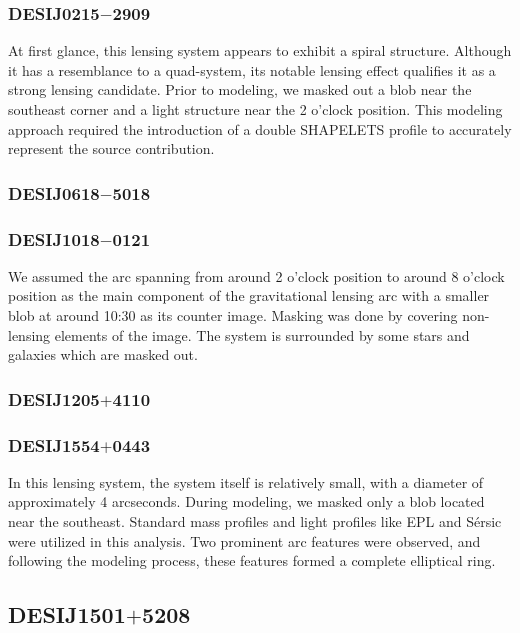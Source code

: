 \documentclass{aa}
\begin{document}
\subsubsection{DESIJ0215$-$2909}

At first glance, this lensing system appears to exhibit a spiral structure. Although it has a resemblance to a quad-system, its notable lensing effect qualifies it as a strong lensing candidate. Prior to modeling, we masked out a blob near the southeast corner and a light structure near the 2 o'clock position. This modeling approach required the introduction of a double SHAPELETS profile to accurately represent the source contribution.

\subsubsection{DESIJ0618$-$5018}


\subsubsection{DESIJ1018$-$0121}

We assumed the arc spanning from around 2 o'clock position to around 8 o'clock position as the main component of the gravitational lensing arc with a smaller blob at around 10:30 as its counter image. Masking was done by covering non-lensing elements of the image. The system is surrounded by some stars and galaxies which are masked out.

\subsubsection{DESIJ1205$+$4110}


\subsubsection{DESIJ1554$+$0443}

In this lensing system, the system itself is relatively small, with a diameter of approximately 4 arcseconds. During modeling, we masked only a blob located near the southeast. Standard mass profiles and light profiles like EPL and S\'ersic  were utilized in this analysis. Two prominent arc features were observed, and following the modeling process, these features formed a complete elliptical ring.

\subsection{DESIJ1501$+$5208}
\end{document}
